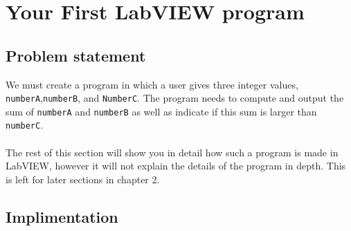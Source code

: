 	\section{Your First LabVIEW program}
	\subsection{Problem statement}
	We must create a program in which a user gives three integer values, \texttt{numberA},\texttt{numberB}, and \texttt{NumberC}. The program needs to compute and output the sum of \texttt{numberA} and \texttt{numberB} as well as indicate if this sum is larger than \texttt{numberC}.\\
	\\
	The rest of this section will show you in detail how such a program is made in LabVIEW, however it will not explain the details of the program in depth. This is left for later sections in chapter 2.\\%
	\subsection{Implimentation}
